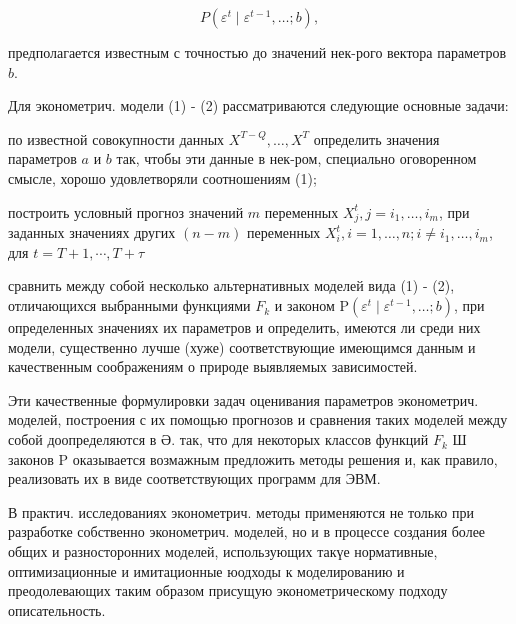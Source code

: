 \documentclass[10pt]{article}
\begin{document}
\[

P\left(\varepsilon^{t} \mid \varepsilon^{t-1}, \ldots ; b\right),

\]



предполагается известным с точностью до значений нек-рого вектора параметров $b$.



Для эконометрич. модели (1) - (2) рассматриваются следующие основные задачи:



по известной совокупности данных $X^{T-Q}, \ldots, X^{T}$ определить значения параметров $a$ и $b$ так, чтобы эти данные в нек-ром, специально оговоренном смысле, хорошо удовлетворяли соотношениям (1);



построить условный прогноз значений $m$ переменных $X_{j}^{t}, j=i_{1}, \ldots, i_{m}$, при заданных значениях других $(n-m)$ переменных $X_{i}^{t}, i=1, \ldots, n ; i \neq i_{1}, \ldots, i_{m}$, для $t=T+1, \cdots, T+\tau$



сравнить между собой несколько альтернативных моделей вида (1) - (2), отличающихся выбранными функциями $F_{k}$ и законом $\mathrm{P}\left(\varepsilon^{t} \mid \varepsilon^{t-1}, \ldots ; b\right)$, при определенных значениях их параметров и определить, имеются ли среди них модели, существенно лучше (хуже) соответствующие имеющимся данным и качественным соображениям о природе выявляемых зависимостей.



Эти качественные формулировки задач оценивания параметров эконометрич. моделей, построения с их помощью прогнозов и сравнения таких моделей между собой доопределяются в Ә. так, что для некоторых классов функций $F_{k}$ Ш законов $\mathrm{P}$ оказывается возмажным предложить методы решения и, как правило, реализовать их в виде соответствующих программ для ЭВМ.



В практич. исследованиях эконометрич. методы применяются не только при разработке собственно эконометрич. моделей, но и в процессе создания более общих и разносторонних моделей, использующих такүе нормативные, оптимизационные и имитационные юодходы к моделированию и преодолевающих таким образом присущую эконометрическому подходу описательность.
\end{document}
